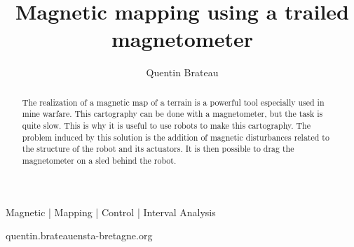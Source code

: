 \documentclass[times, twoside, watermark]{style}
\begin{document}
\title{Magnetic mapping using a trailed magnetometer}

\author[1,\Letter]{Quentin Brateau}


\maketitle

\begin{abstract}
    The realization of a magnetic map of a terrain is a powerful tool especially used in mine warfare. This cartography can be done with a magnetometer, but the task is quite slow. This is why it is useful to use robots to make this cartography. The problem induced by this solution is the addition of magnetic disturbances related to the structure of the robot and its actuators. It is then possible to drag the magnetometer on a sled behind the robot. 
\end {abstract}

\begin{keywords}
Magnetic | Mapping | Control | Interval Analysis
\end{keywords}

\begin{corrauthor}
quentin.brateau\at ensta-bretagne.org
\end{corrauthor}


















% 
\end{document}
